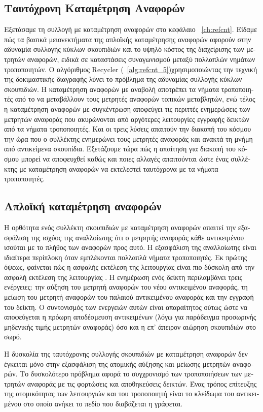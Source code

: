 \begin{greek}
\section{Ταυτόχρονη Καταμέτρηση Αναφορών}
Εξετάσαμε τη συλλογή με καταμέτρηση αναφορών στο κεφάλαιο
~\ref{ch:refcnt}. Είδαμε πώς τα βασικά μειονεκτήματα της
απλοϊκής καταμέτρησης αναφορών αφορούν στην αδυναμία συλλογής
κύκλων σκουπιδιών και το υψηλό κόστος της διαχείρισης των
μετρητών αναφορών, ειδικά σε καταστάσεις συναγωνισμού μεταξύ
πολλαπλών νημάτων τροποποιητών. Ο αλγόριθμος Recycler
(~\ref{alg:refcnt_5})χρησιμοποιώντας την τεχνική της
δοκιμαστικής διαγραφής λύνει το πρόβλημα της αδυναμίας συλλογής
κύκλων σκουπιδιών. Η καταμέτρηση αναφορών με αναβολή αποτρέπει
τα νήματα τροποποιητές από το να μεταβάλλουν τους μετρητές
αναφορών τοπικών μεταβλητών, ενώ τέλος η καταμέτρηση αναφορών
με συγκέντρωση αποφεύγει τις περιττές ενημερώσεις των μετρητών
αναφοράς που ακυρώνονται από αργότερες λειτουργίες εγγραφής
δεικτών από τα νήματα τροποποιητές. Και οι τρεις λύσεις απαιτούν
την διακοπή του κόσμου την ώρα που ο συλλέκτης ενημερώνει τους
μετρητές αναφοράς και ανακτά τη μνήμη από αντικείμενα σκουπίδια. 
Εξετάζουμε τώρα πώς η απαίτηση για διακοπή του κόσμου μπορεί
να αποφευχθεί καθώς και ποιες αλλαγές απαιτούνται ώστε ένας
συλλέκτης με καταμέτρηση αναφορών να εκτελεστεί ταυτόχρονα με
τα νήματα τροποποιητές.

\subsection{Απλοϊκή καταμέτρηση αναφορών}
Η ορθότητα ενός συλλέκτη σκουπιδιών με καταμέτρηση αναφορών
απαιτεί την εξασφάλιση της ισχύος της αναλλοίωτης ότι ο μετρητής
αναφοράς κάθε αντικειμένου ισούται με το πλήθος των αναφορών
προς αυτό. Η εξασφάλιση της αναλλοίωτης είναι ιδιαίτερα περίπλοκη
όταν εμπλέκονται πολλαπλά νήματα τροποποιητές. Εκ πρώτης όψεως,
φαίνεται πώς η ασφαλής εκτέλεση της λειτουργίας 
είναι πιο δύσκολη από την ασφαλή εκτέλεση της λειτουργίας
. Η ενημέρωση ενός δείκτη περιλαμβάνει τρεις
ενέργειες: την αύξηση του μετρητή αναφορών του νέου αντικειμένου
αναφοράς, τη μείωση του μετρητή αναφορών του παλαιού αντικειμένου
αναφοράς και την εγγραφή του δείκτη. Ο συντονισμός των ενεργειών
αυτών είναι απαραίτητος ούτως ώστε να αποφεύγεται η πρόωρη
αποδέσμευση αντικειμένων (λόγω για παράδειγμα προσωρινής μηδενικής
τιμής μετρητών αναφοράς) όσο και η επ' άπειρον αιώρηση σκουπιδιών
στο σωρό.

Η δυσκολία της ταυτόχρονης συλλογής σκουπιδιών με καταμέτρηση αναφορών δεν έγκειται μόνο στην
εξασφάλιση της ατομικής αύξησης και μείωσης μετρητών αναφορών. Το δυσκολότερο πρόβλημα αφορά
το συγχρονισμό των τροποποιήσεων των μετρητών αναφοράς με τις φορτώσεις και αποθηκεύσεις
δεικτών. Ένας τρόπος επίτευξης της ατομικότητας των λειτουργιών  και 
 του τροποποιητή είναι το κλείδωμα του αντικειμένου στο οποίο ανήκει το πεδίο
που διαβάζεται η γράφεται. 


\end{greek}
